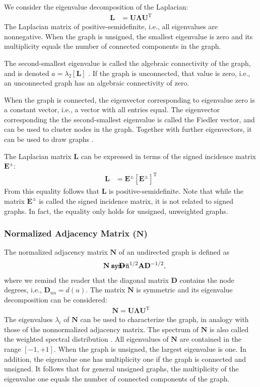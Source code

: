 \documentclass{article}
\def\mathnote#1{%
  \tag*{\rlap{\hspace\marginparsep\smash{\parbox[t]{\marginparwidth}{#1}}}}
}
\begin{document}
We consider the eigenvalue decomposition of the Laplacian:
\begin{align}
  \mathbf L &= \mathbf U \mathbf \Lambda \mathbf U^{\mathrm T}
\end{align}
The Laplacian matrix of positive-semidefinite, i.e., all eigenvalues are
nonnegative.  
When the graph is unsigned, the smallest eigenvalue is zero and its
multiplicity equals the number of connected components in the graph. 

The second-smallest eigenvalue is called the algebraic connectivity of
the graph, and is denoted $a = \lambda_2[\mathbf L]$ \citep{b652}.  If the graph is
unconnected, that value is zero, i.e., an unconnected graph has an
algebraic connectivity of zero. 

When the graph is connected, the eigenvector corresponding to eigenvalue
zero is a constant vector, i.e., a vector with all entries equal. The
eigenvector corresponding the the second-smallest eigenvalue is called
the Fiedler vector, and can be used to cluster nodes in the
graph. Together with further eigenvectors, it can be used to draw
graphs \citep{kunegis:signed-kernels}. 

The Laplacian matrix $\mathbf L$ can be expressed in terms of the signed
incidence matrix $\mathbf E^{\pm}$:
\begin{align}
  \mathbf L &= \mathbf E^{\pm} [\mathbf E^{\pm}]^{\mathrm T}
\end{align}
From this equality follows that $\mathbf L$ is positive-semidefinite.   
Note that while the matrix $\mathbf E^{\pm}$ is called the signed
incidence matrix, it is not related to signed graphs.  In fact, the
equality only holds for unsigned, unweighted graphs. 

\subsubsection{Normalized Adjacency Matrix ($\mathbf N$)}
The normalized adjacency matrix $\mathbf N$ of an undirected graph is
defined as 
\begin{align}
  \mathnote{\texttt{sym-n}}
  \mathbf N &= \mathbf D^{-1/2} \mathbf A \mathbf D^{-1/2},
\end{align}
where we remind the reader that the diagonal matrix $\mathbf D$
contains the node degrees, i.e., $\mathbf D_{uu} = d(u)$. 
The matrix $\mathbf N$ is symmetric and its eigenvalue decomposition can
be considered:
\begin{align}
  \mathbf N = \mathbf U \mathbf \Lambda \mathbf U^{\mathrm T}
\end{align}
The eigenvalues $\lambda_i$ of $\mathbf N$ can be used to characterize
the graph, in analogy with those of the nonnormalized adjacency
matrix.
The spectrum of $\mathbf N$ is also called the weighted spectral
distribution \citep{b864}.
All eigenvalues of $\mathbf N$ are contained in the range
$[-1,+1]$.  When the graph is unsigned, the largest eigenvalue is one.
In addition, the eigenvalue one has multiplicity one if the graph is
connected and unsigned.  It follows that for general unsigned graphs,
the multiplicity of the eigenvalue one equals the number of connected
components of the graph. 
\end{document}

